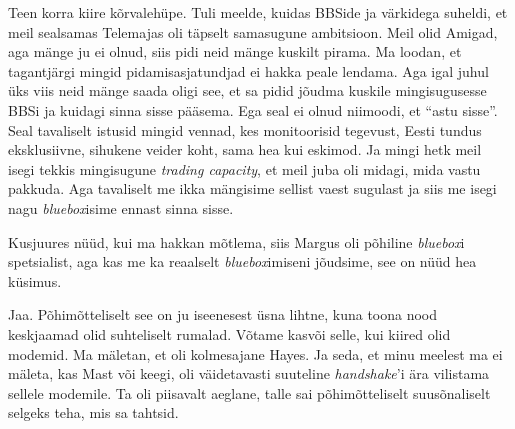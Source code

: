 Teen korra kiire kõrvalehüpe. Tuli meelde, kuidas BBSide ja värkidega suheldi, et meil sealsamas Telemajas oli täpselt samasugune ambitsioon. Meil olid Amigad, aga mänge ju ei olnud, siis pidi neid mänge kuskilt pirama. Ma loodan, et tagantjärgi mingid pidamisasjatundjad ei hakka peale lendama. Aga igal juhul üks viis neid mänge saada oligi see, et sa pidid jõudma kuskile mingisugusesse BBSi ja kuidagi sinna sisse pääsema. Ega seal ei olnud niimoodi, et \enquote{astu sisse}. Seal tavaliselt istusid mingid vennad, kes monitoorisid tegevust,  Eesti tundus eksklusiivne, sihukene veider koht, sama hea kui eskimod. Ja mingi hetk meil isegi tekkis mingisugune \emph{trading capacity}, et meil juba oli midagi, mida  vastu pakkuda. Aga tavaliselt me ikka mängisime sellist vaest sugulast ja siis me isegi nagu \emph{bluebox}isime ennast sinna sisse. 


Kusjuures nüüd, kui ma hakkan mõtlema, siis Margus oli põhiline \emph{bluebox}i spetsialist, aga kas me ka reaalselt \emph{bluebox}imiseni jõudsime, see on nüüd hea küsimus.


Jaa. Põhimõtteliselt see on ju iseenesest üsna lihtne, kuna toona nood keskjaamad olid suhteliselt rumalad.  Võtame kasvõi selle, kui kiired olid modemid. Ma mäletan, et oli kolmesajane Hayes. Ja seda, et minu meelest ma ei mäleta, kas Mast või keegi, oli väidetavasti suuteline \emph{handshake}'i ära vilistama sellele modemile. Ta  oli  piisavalt aeglane, talle sai põhimõtteliselt suusõnaliselt selgeks teha, mis sa tahtsid.

